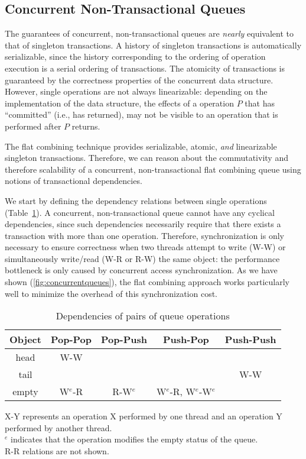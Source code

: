 \subsection{Concurrent Non-Transactional Queues}


The guarantees of concurrent, non-transactional queues are \emph{nearly} equivalent to that of singleton transactions. A history of singleton transactions is automatically serializable, since the history corresponding to the ordering of operation execution is a serial ordering of transactions. The atomicity of transactions is guaranteed by the correctness properties of the concurrent data structure. However, single operations are not always linearizable: depending on the implementation of the data structure, the effects of a operation $P$ that has ``committed'' (i.e., has returned), may not be visible to an operation that is performed after $P$ returns.

The flat combining technique provides serializable, atomic, \emph{and} linearizable singleton transactions\cite{flatcombining}. Therefore, we can reason about the commutativity and therefore scalability of a concurrent, non-transactional flat combining queue using notions of transactional dependencies.

We start by defining the dependency relations between single operations (Table~\ref{table:queuesimpledeps}). A concurrent, non-transactional queue cannot have any cyclical dependencies, since such dependencies necessarily require that there exists a transaction with more than one operation. Therefore, synchronization is only necessary to ensure correctness when two threads attempt to write (W-W) or simultaneously write/read (W-R or R-W) the same object: the performance bottleneck is only caused by concurrent access synchronization. As we have shown (\ref{fig:concurrentqueues}), the flat combining approach works particularly well to minimize the overhead of this synchronization cost.

\begin{table}[h!]
    \centering
\begin{tabular}{c||c|c|c|c}
    Object & Pop-Pop & Pop-Push & Push-Pop & Push-Push\\
    \hline
    head & W-W & & & \\
    tail & & & & W-W\\
    empty & W$^e$-R & R-W$^e$ & W$^e$-R, W$^e$-W$^e$ & \\
\end{tabular}
    \caption*{X-Y represents an operation X performed by one thread and an operation Y performed by another thread.\\$^e$ indicates that the operation modifies the empty status of the queue.\\R-R relations are not shown.}
    \caption{Dependencies of pairs of queue operations}
    \label{table:queuesimpledeps}
\end{table}

